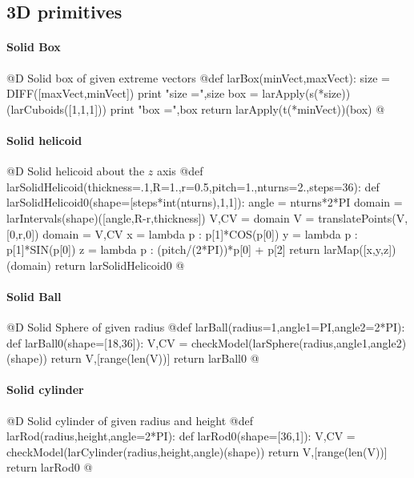 \documentclass[11pt,oneside]{article}	%
\begin{document}
\subsection{3D primitives}


\paragraph{Solid Box}
@D Solid box of given extreme vectors
@{def larBox(minVect,maxVect):
	size = DIFF([maxVect,minVect])
	print "size =",size
	box = larApply(s(*size))(larCuboids([1,1,1]))
	print "box =",box
	return larApply(t(*minVect))(box)
@}

\paragraph{Solid helicoid}
@D Solid helicoid about the $z$ axis
@{def larSolidHelicoid(thickness=.1,R=1.,r=0.5,pitch=1.,nturns=2.,steps=36):
	def larSolidHelicoid0(shape=[steps*int(nturns),1,1]):
		angle = nturns*2*PI
		domain = larIntervals(shape)([angle,R-r,thickness])
		V,CV = domain
		V = translatePoints(V,[0,r,0])
		domain = V,CV
		x = lambda p : p[1]*COS(p[0])
		y = lambda p : p[1]*SIN(p[0])
		z = lambda p : (pitch/(2*PI))*p[0] + p[2]
		return larMap([x,y,z])(domain)
	return larSolidHelicoid0
@}


\paragraph{Solid Ball}
@D Solid Sphere of given radius
@{def larBall(radius=1,angle1=PI,angle2=2*PI):
	def larBall0(shape=[18,36]):
		V,CV = checkModel(larSphere(radius,angle1,angle2)(shape))
		return V,[range(len(V))]
	return larBall0
@}

\paragraph{Solid cylinder}
@D Solid cylinder of given radius and height
@{def larRod(radius,height,angle=2*PI):
	def larRod0(shape=[36,1]):
		V,CV = checkModel(larCylinder(radius,height,angle)(shape))
		return V,[range(len(V))]
	return larRod0
@}
\end{document}
